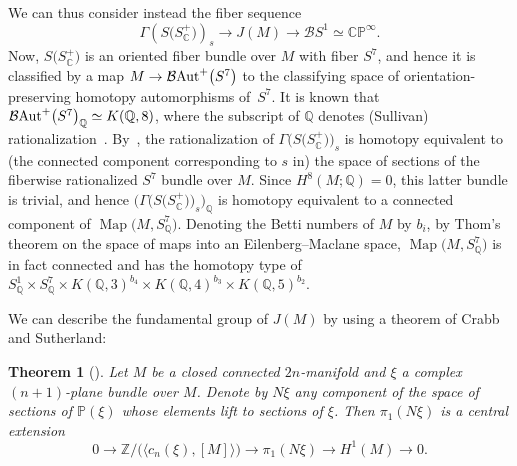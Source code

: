 \documentclass[pdftex]{sigma}%
\newcommand{\CP}{\mathbb{CP}}
\newcommand{\ZZ}{\mathbb{Z}}
\newcommand{\QQ}{\mathbb{Q}}
\newcommand{\C}{\mathbb{C}}
\DeclareMathOperator{\Map}{Map}
\numberwithin{equation}{section}
\newtheorem{Theorem}{Theorem}[section]
\begin{document}
We can thus consider instead the fiber sequence \begin{equation}\label{fibration2} \Gamma(S\big(S_{\C}^+\big))_s \to J(M) \to {\mathcal B}S ^1 \simeq \CP^\infty. \end{equation} Now, $S\big(S_{\C}^+\big)$ is an oriented fiber bundle over $M$ with fiber $S^7$, and hence it is classified by a map $M \to {\mathcal B}{\rm Aut}^+\big(S^7\big)$ to the classifying space of orientation-preserving homotopy automorphisms of~$S^7$. It is known that ${\mathcal B}{\rm Aut}^+\big(S^7\big)_{\QQ} \simeq K(\QQ, 8)$, where the subscript of $\QQ$ denotes (Sullivan) rationalization~\cite[Section~11]{S77}. By~\cite[Theorem~5.3]{M87}, the rationalization of $\Gamma\big(S\big(S_{\C}^+\big)\big)_s$ is homotopy equivalent to (the connected component corresponding to $s$ in) the space of sections of the fiberwise rationalized $S^7$ bundle over $M$. Since $H^8(M;\QQ) = 0$, this latter bundle is trivial, and hence $\big(\Gamma\big(S\big(S_{\C}^+\big)\big)_s\big)_{\QQ}$ is homotopy equivalent to a connected component of $\Map\big(M, S^7_{\QQ}\big)$. Denoting the Betti numbers of $M$ by $b_i$, by Thom's theorem on the space of maps into an Eilenberg--Maclane space, $\Map\big(M, S^7_{\QQ}\big)$ is in fact connected and has the homotopy type of $S^1_{\QQ} \times S^7_{\QQ} \times K(\QQ, 3)^{b_4} \times K(\QQ, 4)^{b_3} \times K(\QQ,5)^{b_2}$.

We can describe the fundamental group of $J(M)$ by using a theorem of Crabb and Sutherland:

\begin{Theorem}[{\cite[Theorem~2.12(i)]{CS84}}] Let $M$ be a closed connected $2n$-manifold and $\xi$ a complex $(n+1)$-plane bundle over $M$. Denote by $N\xi$ any component of the space of sections of $\mathbb{P}(\xi)$ whose elements lift to sections of $\xi$. Then $\pi_1(N\xi)$ is a central extension \[0 \to \ZZ/\big(\big\langle c_n(\xi), [M] \big\rangle \big) \to \pi_1(N\xi) \to H^1(M) \to 0.\]
\end{Theorem}
\end{document}
